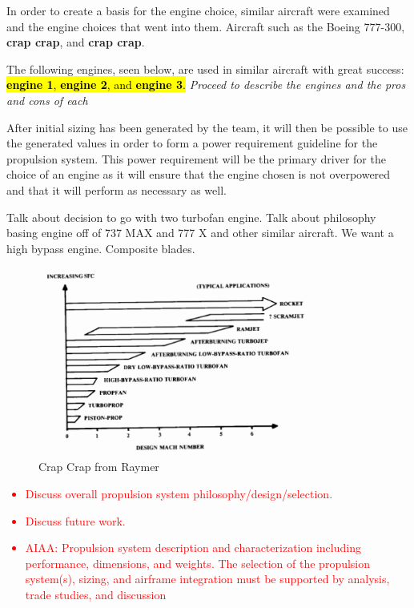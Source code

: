 In order to create a basis for the engine choice, similar aircraft were examined and the engine choices that went into them. Aircraft such as the Boeing 777-300, \textbf{crap crap}, and \textbf{crap crap}.

The following engines, seen below, are used in similar aircraft with great success: \hl{\textbf{engine 1}, \textbf{engine 2}, and \textbf{engine 3}.} \textit{Proceed to describe the engines and the pros and cons of each}

After initial sizing has been generated by the team, it will then be possible to use the generated values in order to form a power requirement guideline for the propulsion system. This power requirement will be the primary driver for the choice of an engine as it will ensure that the engine chosen is not overpowered and that it will perform as necessary as well.  

Talk about decision to go with two turbofan engine. Talk about philosophy basing engine off of 737 MAX and 777 X and other similar aircraft. We want a high bypass engine. Composite blades.

\begin{figure} [h!]
    \centering
    \includegraphics[width=0.8\textwidth]{Photos/PropSelection.PNG}
    \caption{Crap Crap from Raymer}
    \label{PropSelection}
\end{figure}


\textcolor{red}{
\begin{itemize}
    \item Discuss overall propulsion system philosophy/design/selection.
    \item Discuss future work.
    \item AIAA: Propulsion system description and characterization including performance,
    dimensions, and weights. The selection of the propulsion system(s), sizing, and
    airframe integration must be supported by analysis, trade studies, and discussion
\end{itemize}}